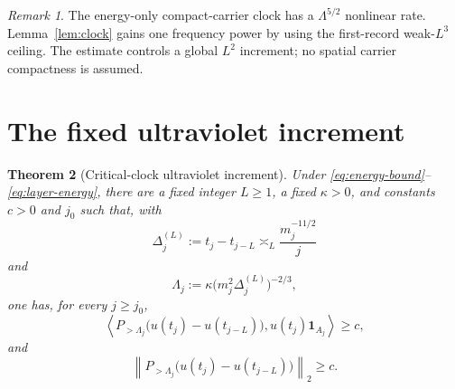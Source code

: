\documentclass[11pt]{article}
\newtheorem{theorem}{Theorem}
\theoremstyle{remark}
\newtheorem{remark}[theorem]{Remark}
\begin{document}
\begin{remark}
The energy-only compact-carrier clock has a
\(\Lambda^{5/2}\) nonlinear rate.  Lemma~\ref{lem:clock} gains one
frequency power by using the first-record weak-\(L^3\) ceiling.  The
estimate controls a global \(L^2\) increment; no spatial carrier
compactness is assumed.
\end{remark}

\section{The fixed ultraviolet increment}

\begin{theorem}[Critical-clock ultraviolet increment]
\label{thm:increment}
Under \eqref{eq:energy-bound}--\eqref{eq:layer-energy}, there are a fixed
integer \(L\geq1\), a fixed \(\kappa>0\), and constants \(c>0\) and
\(j_0\) such that, with
\begin{equation}
 \label{eq:block-gap}
 \Delta_j^{(L)}:=t_j-t_{j-L}
 \asymp_L\frac{m_j^{-11/2}}j
\end{equation}
and
\begin{equation}
 \label{eq:Lambda}
 \Lambda_j
 :=\kappa\bigl(m_j^2\Delta_j^{(L)}\bigr)^{-2/3},
\end{equation}
one has, for every \(j\geq j_0\),
\begin{equation}
 \label{eq:signed-high}
 \boxed{
 \left\langle
 P_{>\Lambda_j}\bigl(u(t_j)-u(t_{j-L})\bigr),
 u(t_j)\mathbf 1_{A_j}
 \right\rangle
 \geq c,
 }
\end{equation}
and
\begin{equation}
 \label{eq:norm-high}
 \boxed{
 \left\|
 P_{>\Lambda_j}\bigl(u(t_j)-u(t_{j-L})\bigr)
 \right\|_2
 \geq c.
 }
\end{equation}
\end{theorem}
\end{document}
